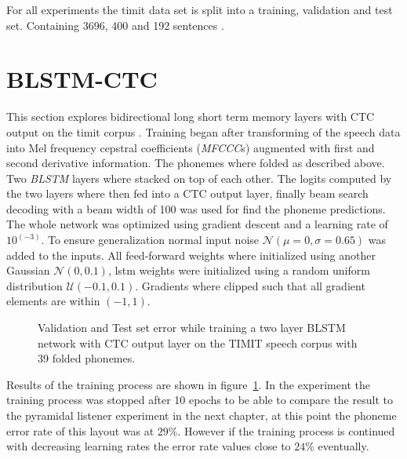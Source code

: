 For all experiments the timit data set is split into a training, validation and test set. Containing 3696, 400 and 192 sentences \cite[page  80]{Graves2012}.  


\section{BLSTM-CTC}
This section explores bidirectional long short term memory layers with CTC output on the timit corpus \cite{Graves2012, Graves2006}. Training began after transforming of the speech data into Mel frequency cepstral coefficients (\textit{MFCCC}s) augmented with first and second derivative information. The phonemes where folded as described above. Two \textit{BLSTM} layers where stacked on top of each other. The logits computed by the two layers where then fed into a CTC output layer, finally beam search decoding with a beam width of 100 was used for find the phoneme predictions. The whole network was optimized using gradient descent and a learning rate of $10^(-3)$. To ensure generalization normal input noise $\mathcal{N}(\mu = 0,\sigma = 0.65)$ was added to the inputs. All feed-forward weights where initialized using another Gaussian $\mathcal{N}(0, 0.1)$, lstm weights were initialized using a random uniform distribution $\mathcal{U}(-0.1, 0.1)$. Gradients where clipped such that all gradient elements are within $(-1,1)$.
\begin{figure}
\centering


\caption{Validation and Test set error while training a two layer BLSTM network with CTC output layer on the TIMIT speech corpus with 39 folded phonemes.}
\label{fig:ctc2BLSTM41}
\end{figure}
Results of the training process are shown in figure~\ref*{fig:ctc2BLSTM41}. In the experiment the training process was stopped after 10 epochs to be able to compare the result to the pyramidal listener experiment in the next chapter, at this point the phoneme error rate of this layout was at $29\%$. However if the training process is continued with decreasing learning rates the error rate values close to $24\%$ eventually.  

